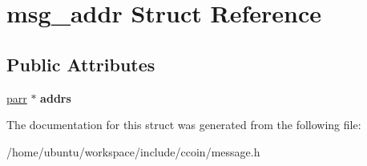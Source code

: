 \hypertarget{structmsg__addr}{\section{msg\-\_\-addr Struct Reference}
\label{structmsg__addr}
}
\subsection*{Public Attributes}
\begin{DoxyCompactItemize}
\item 
\hypertarget{structmsg__addr_a751c1b221e8225ede60ca244fffcc373}{\hyperlink{structparr}{parr} $\ast$ {\bfseries addrs}}\label{structmsg__addr_a751c1b221e8225ede60ca244fffcc373}

\end{DoxyCompactItemize}


The documentation for this struct was generated from the following file\-:\begin{DoxyCompactItemize}
\item 
/home/ubuntu/workspace/include/ccoin/message.\-h\end{DoxyCompactItemize}
